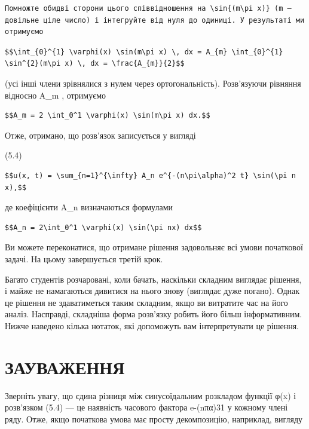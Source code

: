 \documentclass[
  ukrainian,
]{article}
\begin{document}
\begin{verbatim}
Помножте обидві сторони цього співвідношення на \sin{(m\pi x)} (m — довільне ціле число) і інтегруйте від нуля до одиниці. У результаті ми отримуємо
\end{verbatim}

\begin{verbatim}
$$\int_{0}^{1} \varphi(x) \sin(m\pi x) \, dx = A_{m} \int_{0}^{1} \sin^{2}(m\pi x) \, dx = \frac{A_{m}}{2}$$
\end{verbatim}

(усі інші члени зрівнялися з нулем через ортогональність). Розв'язуючи
рівняння відносно A\_m , отримуємо

\begin{verbatim}
$$A_m = 2 \int_0^1 \varphi(x) \sin(m\pi x) dx.$$
\end{verbatim}

Отже, отримано, що розв'язок записується у вигляді

(5.4)

\begin{verbatim}
$$u(x, t) = \sum_{n=1}^{\infty} A_n e^{-(n\pi\alpha)^2 t} \sin(\pi n x),$$
\end{verbatim}

де коефіцієнти A\_n визначаються формулами

\begin{verbatim}
$$A_n = 2\int_0^1 \varphi(x) \sin(\pi nx) dx$$
\end{verbatim}

Ви можете переконатися, що отримане рішення задовольняє всі умови
початкової задачі. На цьому завершується третій крок.

Багато студентів розчаровані, коли бачать, наскільки складним виглядає
рішення, і майже не намагаються дивитися на нього знову (виглядає дуже
погано). Однак це рішення не здаватиметься таким складним, якщо ви
витратите час на його аналіз. Насправді, складніша форма розв'язку
робить його більш інформативним. Нижче наведено кілька нотаток, які
допоможуть вам інтерпретувати це рішення.

\section{ЗАУВАЖЕННЯ}\label{ux437ux430ux443ux432ux430ux436ux435ux43dux43dux44f-4}

Зверніть увагу, що єдина різниця між синусоїдальним розкладом функції
φ(x) і розв'язком (5.4) --- це наявність часового фактора e-(nπα)31 у
кожному члені ряду. Отже, якщо початкова умова має просту декомпозицію,
наприклад, вигляду
\end{document}
